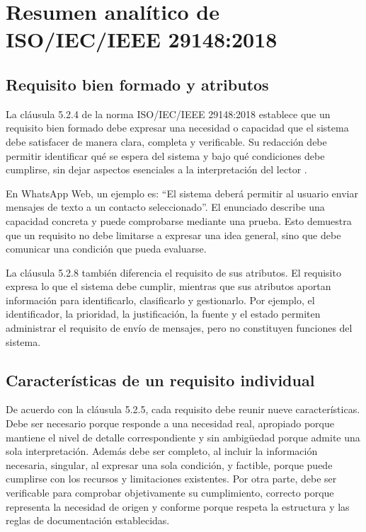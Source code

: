 \documentclass[12pt,a4paper,oneside]{article}
\begin{document}
\section{Resumen analítico de ISO/IEC/IEEE 29148:2018}

\subsection{Requisito bien formado y atributos}

La cláusula 5.2.4 de la norma ISO/IEC/IEEE 29148:2018 establece que un requisito bien formado debe expresar una necesidad o capacidad que el sistema debe satisfacer de manera clara, completa y verificable. Su redacción debe permitir identificar qué se espera del sistema y bajo qué condiciones debe cumplirse, sin dejar aspectos esenciales a la interpretación del lector \cite{iso29148}.

En WhatsApp Web, un ejemplo es: ``El sistema deberá permitir al usuario enviar mensajes de texto a un contacto seleccionado''. El enunciado describe una capacidad concreta y puede comprobarse mediante una prueba. Esto demuestra que un requisito no debe limitarse a expresar una idea general, sino que debe comunicar una condición que pueda evaluarse.

La cláusula 5.2.8 también diferencia el requisito de sus atributos. El requisito expresa lo que el sistema debe cumplir, mientras que sus atributos aportan información para identificarlo, clasificarlo y gestionarlo. Por ejemplo, el identificador, la prioridad, la justificación, la fuente y el estado permiten administrar el requisito de envío de mensajes, pero no constituyen funciones del sistema.

\subsection{Características de un requisito individual}

De acuerdo con la cláusula 5.2.5, cada requisito debe reunir nueve características. Debe ser necesario porque responde a una necesidad real, apropiado porque mantiene el nivel de detalle correspondiente y sin ambigüedad porque admite una sola interpretación. Además debe ser completo, al incluir la información necesaria, singular, al expresar una sola condición, y factible, porque puede cumplirse con los recursos y limitaciones existentes. Por otra parte, debe ser verificable para comprobar objetivamente su cumplimiento, correcto porque representa la necesidad de origen y conforme porque respeta la estructura y las reglas de documentación establecidas.
\end{document}
